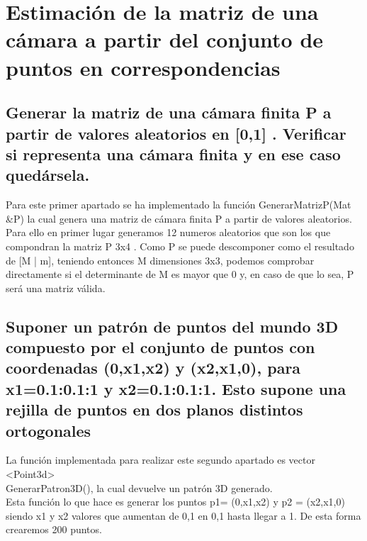 \newpage %

\tableofcontents %

\listoffigures

\newpage




\section{Estimación de la matriz de una cámara a partir del conjunto de puntos en correspondencias}


\subsection{Generar la matriz de una cámara finita P a partir de valores aleatorios en [0,1] . Verificar si representa una cámara finita y en ese caso quedársela.}

Para este primer apartado  se ha implementado la función GenerarMatrizP(Mat \&P) la cual genera una matriz de cámara finita P a partir de valores aleatorios.\\

Para ello en primer lugar generamos 12 numeros aleatorios que son los que compondran la matriz P 3x4 . Como P se puede descomponer como el resultado de [M | m], teniendo entonces M dimensiones 3x3, podemos comprobar directamente si el determinante de  M es mayor que 0 y, en caso de que lo sea, P será una matriz válida.

\subsection{ Suponer un patrón de puntos del mundo 3D compuesto por el conjunto de puntos con coordenadas {(0,x1,x2) y (x2,x1,0), para x1=0.1:0.1:1 y x2=0.1:0.1:1}. Esto supone una rejilla de puntos en dos planos distintos ortogonales}

La función implementada para realizar este segundo apartado es  vector <Point3d>\\  GenerarPatron3D(), la cual devuelve un patrón 3D generado.\\

Esta función lo que hace es  generar los puntos p1= (0,x1,x2) y p2 = (x2,x1,0) siendo x1 y x2 valores que aumentan de 0,1 en 0,1 hasta llegar a 1. De esta forma crearemos 200 puntos.


